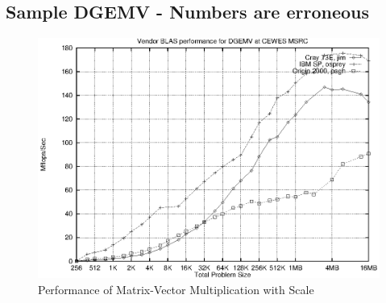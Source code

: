 \documentclass [12pt]{article}
\begin{document}
\subsection{Sample DGEMV - Numbers are erroneous}
\begin{figure}[Hht]
\centerline{\includegraphics{pics/cewes_vdgemv.ps}}
\caption{Performance of Matrix-Vector Multiplication with Scale}\label{dgemv}
\end{figure}
\clearpage
\newpage
\end{document}
